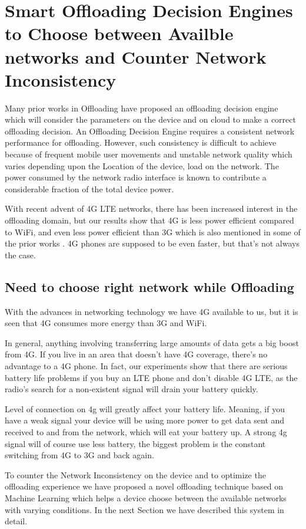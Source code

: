 \documentclass{report}
\begin{document}
\chapter{Smart Offloading Decision Engines to Choose between Availble networks and Counter Network Inconsistency}
\label{chap:SmartDecisionEngine}
Many prior works in Offloading have proposed an offloading decision engine which will consider the parameters on the device and on cloud to make a correct offloading decision. An Offloading Decision Engine requires a consistent network performance for offloading. However, such consistency is difficult to achieve because of frequent mobile user movements and unstable network quality which varies depending upon the Location of the device, load on the network. The power consumed by the network radio interface is known to contribute a considerable fraction of the total device power. 

With recent advent of 4G LTE networks, there has been increased interest in the offloading domain, but our results show that 4G is less power efficient compared to WiFi, and even less power efficient than 3G which is also mentioned in some of the prior works \cite{huang2012close}.
4G phones are supposed to be even faster, but that's not always the case.

\section{Need to choose right network while Offloading}
With the advances in networking technology we have 4G available to us, but it is seen that 4G consumes more energy than 3G and WiFi.

In general, anything involving transferring large amounts of data gets a big boost from 4G. If you live in an area that doesn't have 4G coverage, there's no advantage to a 4G phone. In fact, our experiments show that there are serious battery life problems if you buy an LTE phone and don't disable 4G LTE, as the radio's search for a non-existent signal will drain your battery quickly.

Level of connection on 4g will greatly affect your battery life. Meaning, if you have a weak signal your device will be using more power to get data sent and received to and from the network, which will eat your battery up. A strong 4g signal will of course use less battery, the biggest problem is the constant switching from 4G to 3G and back again.


To counter the Network Inconsistency on the device and to optimize the offloading experience we have proposed a novel offloading technique based on Machine Learning which helps a device choose between the available networks with varying conditions. In the next Section we have described this system in detail.
\end{document}
